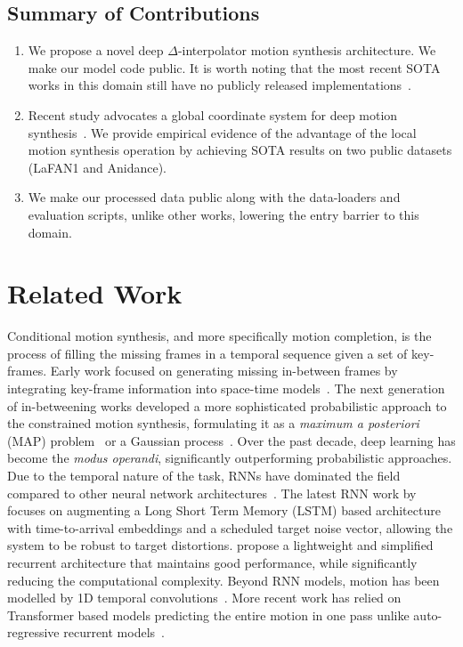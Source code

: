 \documentclass[letterpaper]{article} \usepackage[]{aaai23}  \usepackage{times}  \usepackage{helvet}  \usepackage{courier}  \usepackage[hyphens]{url}  \usepackage{graphicx} \urlstyle{rm} \def\UrlFont{\rm}  \usepackage{natbib}  \usepackage{caption} \frenchspacing  \setlength{\pdfpagewidth}{8.5in} \setlength{\pdfpageheight}{11in}
\begin{document}
\subsection{Summary of Contributions}



\begin{enumerate}
    \item We propose a novel deep $\Delta$-interpolator motion synthesis architecture. We make our model code public. It is worth noting that the most recent SOTA works in this domain still have no publicly released implementations~\cite{harvey2020robust, duan2021singleshot}.
    \item Recent study advocates a global coordinate system for deep motion synthesis~\cite{duan2021singleshot}. We provide empirical evidence of the advantage of the local motion synthesis operation by achieving SOTA results on two public datasets (LaFAN1 and Anidance).
    \item We make our processed data public along with the data-loaders and evaluation scripts, unlike other works, lowering the entry barrier to this domain.
\end{enumerate}

\section{Related Work}

Conditional motion synthesis, and more specifically motion completion, is the process of filling the missing frames in a temporal sequence given a set of key-frames. Early work focused on generating missing in-between frames by integrating key-frame information into space-time  models~\cite{witkin1988spacetime, ngo1993spacetime}. The next generation of in-betweening works developed a more sophisticated probabilistic approach to the constrained motion synthesis, formulating it as a \emph{maximum a posteriori} (MAP) problem~\cite{chai2007constraint} or a Gaussian process~\cite{grochow2004style, wang2007gaussian}. Over the past decade, deep learning has become the \emph{modus operandi}, significantly outperforming probabilistic approaches. Due to the temporal nature of the task, RNNs have dominated the field compared to other neural network architectures~\cite{holden2016framework, harvey2018recurrent}. The latest RNN work by~\citet{harvey2020robust} focuses on augmenting a Long Short Term Memory (LSTM) based architecture with time-to-arrival embeddings and a scheduled target noise vector, allowing the system to be robust to target distortions. \citet{gelejein2021lightweight} propose a lightweight and simplified recurrent architecture that maintains good performance, while significantly reducing the computational complexity. Beyond RNN models, motion has been modelled by 1D temporal convolutions~\cite{holden2015learning}. More recent work has relied on Transformer based models predicting the entire motion in one pass unlike auto-regressive recurrent models~\citep{devlin2018bert,duan2021singleshot}. 
\end{document}
